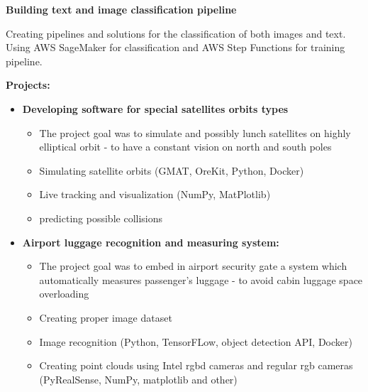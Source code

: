 \documentclass[10pt,a4paper,ragged2e,withhyper, normalphoto]{altacv}
\begin{document}
\begin{paracol}{2}


    \textbf{\textcolor{DarkPastelRed}{Building text and image classification pipeline}}
    
    Creating pipelines and solutions for the classification of both images and text. Using AWS SageMaker for classification and AWS Step Functions for training pipeline. 
    
    \divider
    
    \textbf{Projects:}
    \begin{itemize}
        \item\textbf{\textcolor{DarkPastelRed}{Developing software for special satellites orbits types}}
        \begin{itemize}
            \item The project goal was to simulate and possibly lunch satellites on highly elliptical orbit - to have a constant vision on north and south poles
            \item Simulating satellite orbits (GMAT, OreKit, Python, Docker)
            \item Live tracking and visualization (NumPy, MatPlotlib)
            \item predicting possible collisions
        \end{itemize}
        \item \textbf{\textcolor{DarkPastelRed}{Airport luggage recognition and measuring system:}}
        \begin{itemize}
            \item The project goal was to embed in airport security gate a system which automatically measures passenger's luggage - to avoid cabin luggage space overloading
            \item Creating proper image dataset
            \item Image recognition (Python, TensorFLow, object detection API, Docker)
            \item Creating point clouds using Intel rgbd cameras and regular rgb cameras (PyRealSense, NumPy, matplotlib and other)
        \end{itemize}

\end{itemize}
\end{paracol}
\end{document}
